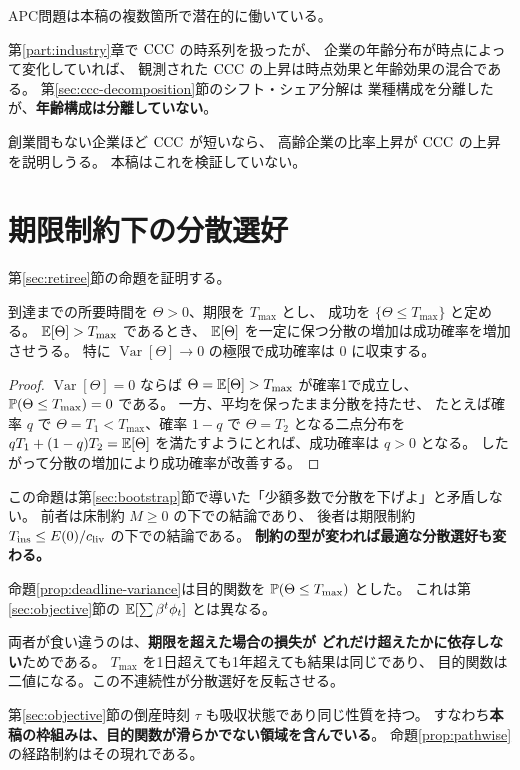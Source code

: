 \begin{remark}[本稿における現れ方]
\label{rem:apc-in-this-work}
APC問題は本稿の複数箇所で潜在的に働いている。

第\ref{part:industry}章で $\mathrm{CCC}$ の時系列を扱ったが、
企業の年齢分布が時点によって変化していれば、
観測された $\mathrm{CCC}$ の上昇は時点効果と年齢効果の混合である。
第\ref{sec:ccc-decomposition}節のシフト・シェア分解は
業種構成を分離したが、\textbf{年齢構成は分離していない}。

創業間もない企業ほど $\mathrm{CCC}$ が短いなら、
高齢企業の比率上昇が $\mathrm{CCC}$ の上昇を説明しうる。
本稿はこれを検証していない。
\end{remark}

\section{期限制約下の分散選好}

第\ref{sec:retiree}節の命題を証明する。

\begin{proposition}[期限下では分散最小化が最適でない]
\label{prop:deadline-variance}
到達までの所要時間を $\Theta>0$、期限を $T_{\max}$ とし、
成功を $\{\Theta \leq T_{\max}\}$ と定める。
$\mathbb{E}[\Theta] > T_{\max}$ であるとき、
$\mathbb{E}[\Theta]$ を一定に保つ分散の増加は成功確率を増加させうる。
特に $\operatorname{Var}[\Theta]\to 0$ の極限で成功確率は $0$ に収束する。
\end{proposition}

\begin{proof}
$\operatorname{Var}[\Theta]=0$ ならば $\Theta = \mathbb{E}[\Theta] > T_{\max}$ が確率1で成立し、
$\mathbb{P}(\Theta\leq T_{\max})=0$ である。
一方、平均を保ったまま分散を持たせ、
たとえば確率 $q$ で $\Theta=T_1<T_{\max}$、確率 $1-q$ で $\Theta=T_2$ となる二点分布を
$qT_1+(1-q)T_2=\mathbb{E}[\Theta]$ を満たすようにとれば、成功確率は $q>0$ となる。
したがって分散の増加により成功確率が改善する。
\end{proof}

\begin{remark}[床制約との対比]
この命題は第\ref{sec:bootstrap}節で導いた「少額多数で分散を下げよ」と矛盾しない。
前者は床制約 $M\geq 0$ の下での結論であり、
後者は期限制約 $T_{\mathrm{ins}} \leq E(0)/c_{\rm liv}$ の下での結論である。
\textbf{制約の型が変われば最適な分散選好も変わる。}
\end{remark}

\begin{remark}[目的関数が成功確率であることの含意]
\label{rem:deadline-objective}
命題\ref{prop:deadline-variance}は目的関数を $\mathbb{P}(\Theta\leq T_{\max})$ とした。
これは第\ref{sec:objective}節の $\mathbb{E}[\sum\beta^t\phi_t]$ とは異なる。

両者が食い違うのは、\textbf{期限を超えた場合の損失が
どれだけ超えたかに依存しない}ためである。
$T_{\max}$ を1日超えても1年超えても結果は同じであり、
目的関数は二値になる。この不連続性が分散選好を反転させる。

第\ref{sec:objective}節の倒産時刻 $\tau$ も吸収状態であり同じ性質を持つ。
すなわち\textbf{本稿の枠組みは、目的関数が滑らかでない領域を含んでいる}。
命題\ref{prop:pathwise}の経路制約はその現れである。
\end{remark}

